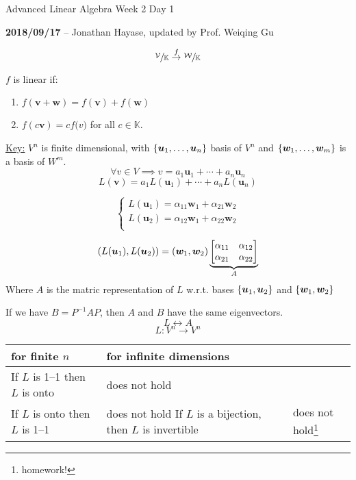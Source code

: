 \documentclass{article}
\newcommand{\m}[1]{\begin{bmatrix} #1 \end{bmatrix}}
\begin{document}
\begin{center}
  \Large Advanced Linear Algebra Week 2 Day 1
  \normalsize

  \textbf{2018/09/17} -- Jonathan Hayase, updated by Prof. Weiqing Gu
\end{center}

\[\sfrac{\mathcal{V}}{\mathbb{K}}\stackrel{f}{\to}\sfrac{\mathcal{W}}{\mathbb{K}}\]

\(f\) is linear if:
\begin{enumerate}[label=\roman*.]
\item \(f(\bm v + \bm w) = f(\bm v) + f(\bm w)\)
\item \(f(c \bm v) = cf\bm(v)\) for all \(c \in \mathbb{K}\).
\end{enumerate}

\underline{Key:} \(V^n\) is finite dimensional, with \(\set{\bm u_1, \dots, \bm u_n}\) basis of \(V^n\) and \(\set{\bm w_1, \dots, \bm w_m}\) is a basis of \(W^m\).
\[\forall v \in V\implies v = a_1 \bm u_1 + \cdots + a_n \bm u_n\]
\[L(\bm v) = a_1 L(\bm u_1) + \cdots + a_n L(\bm u_n)\]

\[
  \begin{cases}
    L(\bm u_1) = \alpha_{11} \bm w_1 + \alpha_{21} \bm w_2\\
    L(\bm u_2) = \alpha_{12} \bm w_1 + \alpha_{22} \bm w_2\\
  \end{cases}
\]

\[(L(\bm u_1), L(\bm u_2)) = \del{\bm w_1, \bm w_2} \underbrace{\m{\alpha_{11} & \alpha_{12}\\\alpha_{21} & \alpha_{22}}}_{A}\]
Where \(A\) is the matric representation of \(L\) w.r.t. bases \(\set{\bm u_1, \bm u_2}\) and \(\set{\bm w_1, \bm w_2}\)

\begin{aside}[Recall:]
  If we have \(B = P^{-1}AP\), then \(A\) and \(B\) have the same eigenvectors.
  \[L \longleftrightarrow A\]
  \[L:V^n \to V^n\]
  \begin{center}
    \begin{tabu}{ll}
      \toprule
      for finite \(n\) & for infinite dimensions\\
      \midrule
      If \(L\) is 1--1 then \(L\) is onto & does not hold\\
      If \(L\) is onto then \(L\) is 1--1 & does not hold
      If \(L\) is a bijection, then \(L\) is invertible & does not hold\footnote{homework!}\\
      \bottomrule
    \end{tabu}
  \end{center}


\end{aside}
\end{document}
